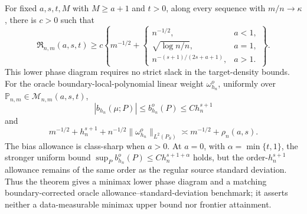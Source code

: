 For fixed \(a,s,t,M\) with \(M\ge a+1\) and \(t>0\), along every sequence with \(m/n\to\kappa\), there is \(c>0\) such that
\[
\mathfrak R_{n,m}(a,s,t)\ge c\left\{m^{-1/2}+\begin{cases}
n^{-1/2},&a<1,\\
\sqrt{\log n/n},&a=1,\\
n^{-(s+1)/(2s+a+1)},&a>1.
\end{cases}\right\}.
\]
This lower phase diagram requires no strict slack in the target-density bounds. For the oracle boundary-local-polynomial linear weight \(\omega_{h_n}^o\), uniformly over \(\mathbb P_{n,m}\in\mathcal M_{n,m}(a,s,t)\),
\[
|b_{h_n}(\mu;P)|\le b_{h_n}^o(P)\le C h_n^{s+1}
\]
and
\[
m^{-1/2}+h_n^{s+1}+n^{-1/2}\|\omega_{h_n}^o\|_{L^2(P_S)}
\asymp m^{-1/2}+\rho_n(a,s).
\]
The bias allowance is class-sharp when \(a>0\). At \(a=0\), with \(\alpha=\min\{t,1\}\), the stronger uniform bound \(\sup_P b_{h_n}^o(P)\le C h_n^{s+1+\alpha}\) holds, but the order-\(h_n^{s+1}\) allowance remains of the same order as the regular source standard deviation. Thus the theorem gives a minimax lower phase diagram and a matching boundary-corrected oracle allowance--standard-deviation benchmark; it asserts neither a data-measurable minimax upper bound nor frontier attainment.